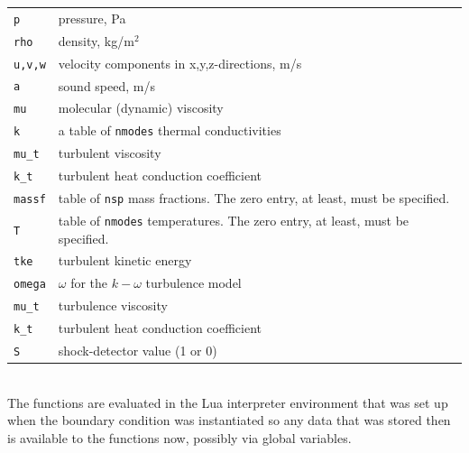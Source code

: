 \begin{tabular}{lp{12cm}}
 \texttt{p} &  pressure, Pa \\
 \texttt{rho} & density, kg/m$^2$ \\
 \texttt{u,v,w} & velocity components in x,y,z-directions, m/s \\
 \texttt{a} & sound speed, m/s \\
 \texttt{mu} & molecular (dynamic) viscosity \\
 \texttt{k} & a table of \texttt{nmodes} thermal conductivities \\
 \texttt{mu\_t} &  turbulent viscosity \\
 \texttt{k\_t} &  turbulent heat conduction coefficient \\
 \texttt{massf} & table of \texttt{nsp} mass fractions. The zero entry, at least, must be specified. \\
 \texttt{T} & table of \texttt{nmodes} temperatures. The zero entry, at least, must be specified. \\
 \texttt{tke} &  turbulent kinetic energy \\
 \texttt{omega} &  $\omega$ for the $k-\omega$ turbulence model \\
 \texttt{mu\_t} &  turbulence viscosity \\
 \texttt{k\_t} &  turbulent heat conduction coefficient \\
 \texttt{S} & shock-detector value (1 or 0) \\
\end{tabular}\\

\medskip
The functions are evaluated in the Lua interpreter environment that was set up
when the boundary condition was instantiated so any data that was stored then is
available to the functions now, possibly via global variables.

